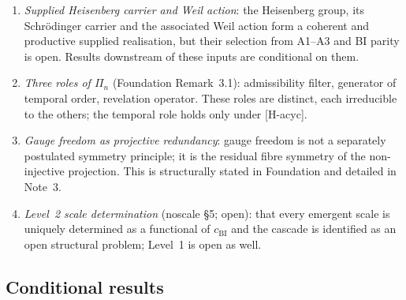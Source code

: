 \documentclass[11pt,a4paper]{article}
\theoremstyle{definition}
\newcommand{\cchi}{c_{\mathrm{BI}}}
\begin{document}
      \begin{enumerate}
        \item \textit{Supplied Heisenberg carrier and Weil action}:
        the Heisenberg group, its Schr\"odinger carrier and the associated Weil action form a coherent
        and productive supplied realisation, but their selection from A1--A3 and BI parity is open.
        Results downstream of these inputs are conditional on them.

        \item \textit{Three roles of $\Pi_n$} (Foundation Remark~3.1):
        admissibility filter, generator of temporal order, revelation operator.
        These roles are distinct, each irreducible to the others; the temporal role holds only
        under [H-acyc].

        \item \textit{Gauge freedom as projective redundancy}:
        gauge freedom is not a separately postulated symmetry principle; it is the residual
        fibre symmetry of the non-injective projection.
        This is structurally stated in Foundation and detailed in Note~3.

        \item \textit{Level~2 scale determination} (noscale §5; open):
        that every emergent scale is uniquely determined as a functional of $\cchi$ and the
        cascade is identified as an open structural problem; Level~1 is open as well.
      \end{enumerate}

    \subsection{Conditional results}
      \label{sec:conditional}
\end{document}
